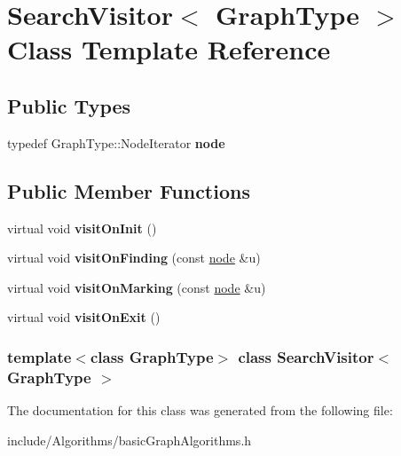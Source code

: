 \hypertarget{class_search_visitor}{
\section{SearchVisitor$<$ GraphType $>$ Class Template Reference}
\label{class_search_visitor}
}
\subsection*{Public Types}
\begin{DoxyCompactItemize}
\item 
\hypertarget{class_search_visitor_aa563d426b39bfd21243bcac1e0eb794b}{
typedef GraphType::NodeIterator {\bfseries node}}
\label{class_search_visitor_aa563d426b39bfd21243bcac1e0eb794b}

\end{DoxyCompactItemize}
\subsection*{Public Member Functions}
\begin{DoxyCompactItemize}
\item 
\hypertarget{class_search_visitor_ac4796df22b5fbb42f806b1e9d503b25d}{
virtual void {\bfseries visitOnInit} ()}
\label{class_search_visitor_ac4796df22b5fbb42f806b1e9d503b25d}

\item 
\hypertarget{class_search_visitor_aecd980d3bdb996648caeacbffa9b7ba8}{
virtual void {\bfseries visitOnFinding} (const \hyperlink{classnode}{node} \&u)}
\label{class_search_visitor_aecd980d3bdb996648caeacbffa9b7ba8}

\item 
\hypertarget{class_search_visitor_ace1ae38f04510c49190c19e7716cbeac}{
virtual void {\bfseries visitOnMarking} (const \hyperlink{classnode}{node} \&u)}
\label{class_search_visitor_ace1ae38f04510c49190c19e7716cbeac}

\item 
\hypertarget{class_search_visitor_ae1b436bfc0f16b38bb573c65d0f10fa6}{
virtual void {\bfseries visitOnExit} ()}
\label{class_search_visitor_ae1b436bfc0f16b38bb573c65d0f10fa6}

\end{DoxyCompactItemize}
\subsubsection*{template$<$class GraphType$>$ class SearchVisitor$<$ GraphType $>$}



The documentation for this class was generated from the following file:\begin{DoxyCompactItemize}
\item 
include/Algorithms/basicGraphAlgorithms.h\end{DoxyCompactItemize}
